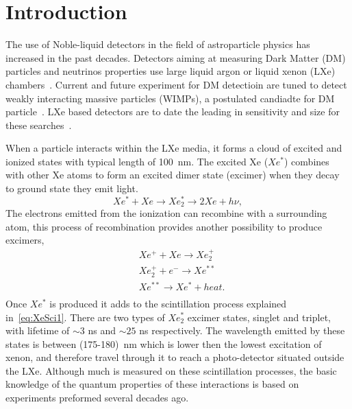 \section{Introduction}
\label{sec:Intro}

The use of Noble-liquid detectors in the field of astroparticle physics has increased in the past decades. Detectors aiming at measuring Dark Matter (DM) particles and neutrinos properties use large liquid argon or liquid xenon (LXe) chambers~\cite{Aprile:2009dv,Rubbia:2013tpa}. Current and future experiment for DM detectioin are tuned to detect weakly interacting massive particles (WIMPs), a postulated candiadte for DM particle~\cite{Bertone:2010zza}. LXe based detectors are to date the leading in sensitivity and size for these searches~\cite{Aprile:2017iyp,Akerib:2016vxi,Fu:2016ega,Aalbers:2016jon}. 

When a particle interacts within the LXe media, it forms a cloud of excited and ionized states with typical length of 100~nm. The excited Xe ($Xe^*$) combines with other Xe atoms to form an excited dimer state (excimer) when they decay to ground state they emit light. 
\begin{equation} \label{eq:XeSci1}
 Xe^*+Xe \rightarrow Xe^*_2 \rightarrow 2Xe + h \nu , 
\end{equation}
The electrons emitted from the ionization can recombine with a surrounding atom, this process of recombination provides another possibility to produce excimers,
\begin{equation} \label{eq:XeSci2}
\begin{split}
  &Xe^{+} + Xe \rightarrow Xe^{+}_2 \\
  &Xe^{+}_2 + e^{-}  \rightarrow Xe^{**} \\
  &Xe^{**}   \rightarrow Xe^* + heat .\\
  \end{split}
\end{equation}  
Once $Xe^*$ is produced it adds to the scintillation process explained in~\ref{eq:XeSci1}. There are two types of $Xe^*_2$ excimer states, singlet and triplet, with lifetime of $\sim3$ ns and $\sim25$ ns respectively. The wavelength emitted by these states is between (175-180)~nm which is lower then the lowest excitation of xenon, and therefore travel through it to reach a photo-detector situated outside the LXe. Although much is measured on these scintillation processes, the basic knowledge of the quantum properties of these interactions is based on experiments preformed several decades ago.

